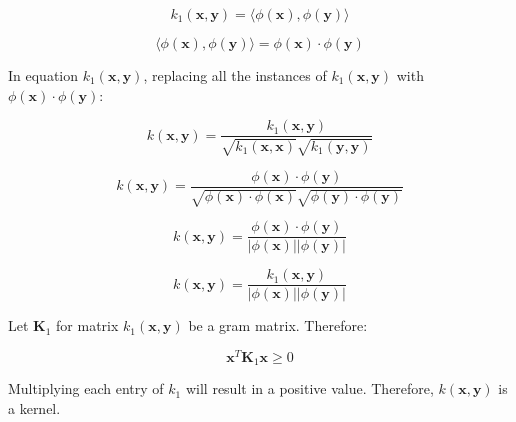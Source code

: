 \documentclass[10pt]{article}
\begin{document}
\[
k_1(\textbf{x},\textbf{y}) = \langle \phi(\textbf{x}), \phi(\textbf{y}) \rangle
\]

\[
\langle \phi(\textbf{x}), \phi(\textbf{y}) \rangle = \phi (\textbf{x}) \cdot \phi (\textbf{y})
\]

In equation $k_1(\textbf{x},\textbf{y})$, replacing all the instances of $k_1(\textbf{x},\textbf{y})$ with $ \phi (\textbf{x}) \cdot \phi (\textbf{y})$: 


\[
k(\textbf{x},\textbf{y}) = \frac{k_1(\textbf{x},\textbf{y})}{\sqrt{k_1(\textbf{x},\textbf{x})} \sqrt{k_1(\textbf{y},\textbf{y})}}
\]

\[
k(\textbf{x},\textbf{y}) = \frac{\phi (\textbf{x}) \cdot \phi (\textbf{y})}{\sqrt{\phi (\textbf{x}) \cdot \phi (\textbf{x})} \sqrt{\phi (\textbf{y}) \cdot \phi (\textbf{y})}}
\]

\[
k(\textbf{x},\textbf{y}) = \frac{\phi (\textbf{x}) \cdot \phi (\textbf{y})}{|\phi (\textbf{x})| |\phi (\textbf{y})|}
\]

\[
k(\textbf{x},\textbf{y}) = \frac{k_1(\textbf{x},\textbf{y})} {|\phi (\textbf{x})| |\phi (\textbf{y})|}
\]

Let $\textbf{K}_1$ for matrix $k_1(\textbf{x},\textbf{y})$ be a gram matrix. Therefore: 

\[
\textbf{x}^{T} \textbf{K}_1 \textbf{x} \geq 0
\]

Multiplying each entry of $k_1$ will result in a positive value. Therefore, $k(\textbf{x},\textbf{y})$ is a kernel.


\pagebreak
\end{document}
